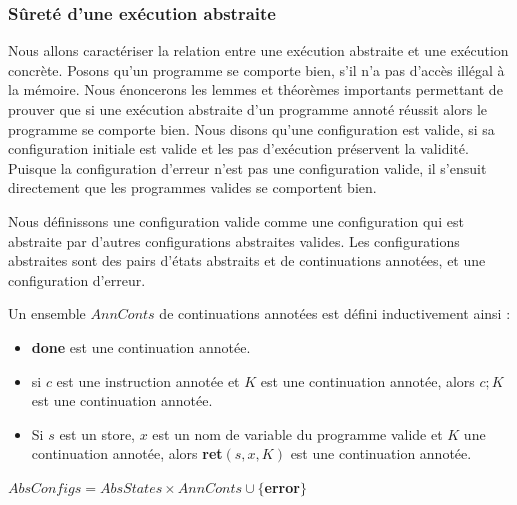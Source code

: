 \documentclass[9pt,openany]{book}
\begin{document}
			\subsubsection{S\^uret\'e d'une ex\'ecution abstraite}
		Nous allons caract\'eriser la relation entre une ex\'ecution abstraite et une ex\'ecution concr\`ete. Posons qu'un programme se comporte bien, s'il n'a pas d'acc\`es ill\'egal \`a la m\'emoire. Nous \'enoncerons les lemmes et th\'eor\`emes importants permettant de prouver que si une ex\'ecution abstraite d'un programme annot\'e r\'eussit alors le programme se comporte bien. Nous disons qu'une configuration est valide, si sa configuration initiale est valide et les pas d'ex\'ecution pr\'eservent la validit\'e. Puisque la configuration d'erreur n'est pas une configuration valide, il s'ensuit directement que les programmes valides se comportent bien.\par
		Nous d\'efinissons une configuration valide comme une configuration qui est abstraite par d'autres configurations abstraites valides. Les configurations abstraites sont des pairs d'\'etats abstraits et de continuations annot\'ees, et une configuration d'erreur. \par 
		Un ensemble $AnnConts$ de continuations annot\'ees est d\'efini inductivement ainsi :\par 
		\begin{itemize}
		\item \textbf{done} est une continuation annot\'ee.
		\item si $c$ est une instruction annot\'ee et $K$ est une continuation annot\'ee, alors $c;K$ est une continuation annot\'ee.
		\item Si $s$ est un store, $x$ est un nom de variable du programme valide et $K$ une continuation annot\'ee, alors \textbf{ret}$(s,x,K)$ est une continuation annot\'ee.
		\end{itemize}
		
		\begin{center}
		$AbsConfigs = AbsStates \times AnnConts \cup \{$\textbf{error}$\}$
		\end{center}
		
\end{document}
